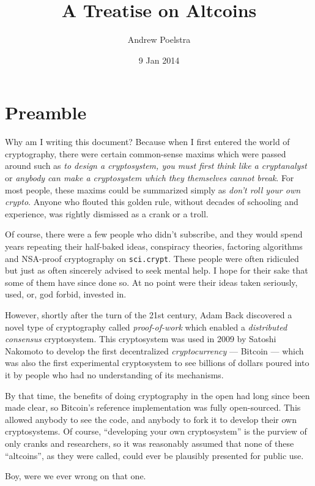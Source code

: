 \documentclass[letterpaper]{article}
\title{A Treatise on Altcoins}
\author{Andrew Poelstra}
\date{9 Jan 2014}
\begin{document}
\maketitle

\section{Preamble}

Why am I writing this document? Because when I first entered the
world of cryptography, there were certain common-sense maxims which
were passed around such as \emph{to design a cryptosystem, you must
first think like a cryptanalyst} or \emph{anybody can make a cryptosystem
which they themselves cannot break}. For most people, these maxims
could be summarized simply as \emph{don't roll your own crypto}. Anyone
who flouted this golden rule, without decades of schooling and experience,
was rightly dismissed as a crank or a troll.

Of course, there were a few people who didn't subscribe, and they would
spend years repeating their half-baked ideas, conspiracy theories, factoring
algorithms and NSA-proof cryptography on \texttt{sci.crypt}. These people
were often ridiculed but just as often sincerely advised to seek mental help.
I hope for their sake that some of them have since done so. At no point were
their ideas taken seriously, used, or, god forbid, invested in.

However, shortly after the turn of the 21st century, Adam Back discovered
a novel type of cryptography called \emph{proof-of-work} which enabled a
\emph{distributed consensus}
cryptosystem. This cryptosystem was used in 2009 by Satoshi Nakomoto to
develop the first decentralized \emph{cryptocurrency} --- Bitcoin --- which
was also the first experimental cryptosystem to see billions of dollars
poured into it by people who had no understanding of its mechanisms.

By that time, the benefits of doing cryptography in the open had long
since been made clear, so Bitcoin's reference implementation was fully
open-sourced. This allowed anybody to see the code, and anybody to fork
it to develop their own cryptosystems. Of course, ``developing your own
cryptosystem'' is the purview of only cranks and researchers, so it was
reasonably assumed that none of these ``altcoins'', as they were called,
could ever be plausibly presented for public use.

Boy, were we ever wrong on that one.
\end{document}
